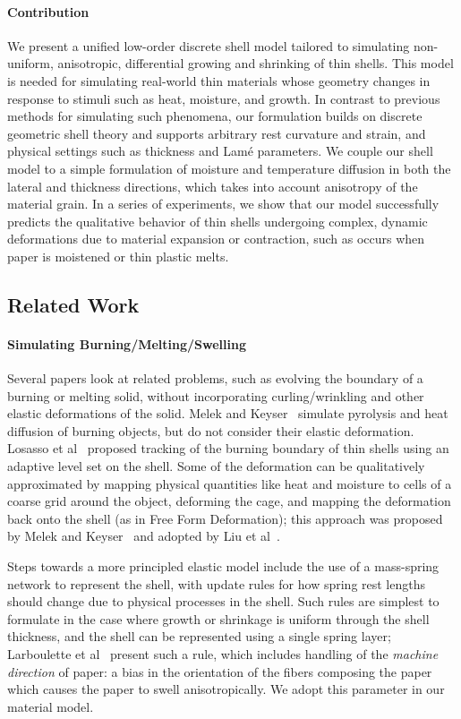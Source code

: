 \documentclass[timestamp,acmtog]{acmart}
\begin{document}
\paragraph{Contribution} We present a unified low-order discrete shell model tailored to simulating non-uniform, anisotropic, differential growing and shrinking of thin shells. This model is needed for simulating real-world thin materials whose geometry changes in response to stimuli such as heat, moisture, and growth. In contrast to previous methods for simulating such phenomena, our formulation builds on discrete geometric shell theory and supports arbitrary rest curvature and strain, and physical settings such as thickness and Lam\'{e} parameters. We couple our shell model to a simple formulation of moisture and temperature diffusion in both the lateral and thickness directions, which takes into account anisotropy of the material grain. In a series of experiments, we show that our model successfully predicts the qualitative behavior of thin shells undergoing complex, dynamic deformations due to material expansion or contraction, such as occurs when paper is moistened or thin plastic melts.

\subsection{Related Work}
\paragraph{Simulating Burning/Melting/Swelling} Several papers look at related problems, such as evolving the boundary of a burning or melting solid, without incorporating curling/wrinkling and other elastic deformations of the solid. Melek and Keyser~ simulate pyrolysis and heat diffusion of burning objects, but do not consider their elastic deformation. Losasso et al~ proposed tracking of the burning boundary of thin shells using an adaptive level set on the shell. Some of the deformation can be qualitatively approximated by mapping physical quantities like heat and moisture to cells of a coarse grid around the object, deforming the cage, and mapping the deformation back onto the shell (as in Free Form Deformation); this approach was proposed by Melek and Keyser~ and adopted by Liu et al~.

Steps towards a more principled elastic model include the use of a mass-spring network to represent the shell, with update rules for how spring rest lengths should change due to physical processes in the shell. Such rules are simplest to formulate in the case where growth or shrinkage is uniform through the shell thickness, and the shell can be represented using a single spring layer; Larboulette et al~ present such a rule, which includes handling of the \emph{machine direction} of paper: a bias in the orientation of the fibers composing the paper which causes the paper to swell anisotropically. We adopt this parameter in our material model. 
\end{document}
